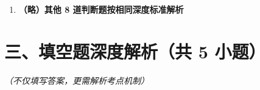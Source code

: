 \documentclass[12pt, a4paper]{ctexart}
\begin{document}
\begin{enumerate}[label=\textbf{\arabic*.}, leftmargin=*, itemsep=1.5em]
\begin{bluebox}{答案与深度解析}
		      \textbf{【应背诵知识点】}
		      \begin{itemize}[leftmargin=*, nosep]
			      \item static 无 this
			      \item static 不能访问非静态成员
		      \end{itemize}
	      \end{bluebox}

	\item \textbf{（略）其他 8 道判断题按相同深度标准解析}
\end{enumerate}

\section*{三、填空题深度解析（共 5 小题）}
\textit{（不仅填写答案，更需解析考点机制）}
\end{document}
